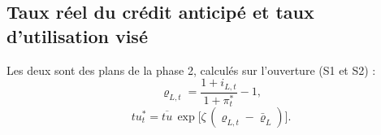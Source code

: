 \documentclass[11pt,a4paper]{article}
\begin{document}
\subsection{Taux réel du crédit anticipé et taux d'utilisation visé}
\label{sec:investissement-taux}
\begin{proposee}
Les deux sont des plans de la phase 2, calculés sur l'ouverture (S1 et S2) :
\begin{equation*}
\varrho_{L,t} = \frac{1 + i_{L,t}}{1 + \pi^\ast_t} - 1, \tag{S1}
\end{equation*}
\begin{equation*}
\mathit{tu}^\ast_t = \overline{\mathit{tu}}\, \exp\bigl[\zeta\,(\varrho_{L,t} - \bar\varrho_L)\bigr] . \tag{S2}
\end{equation*}


\end{proposee}
\end{document}
